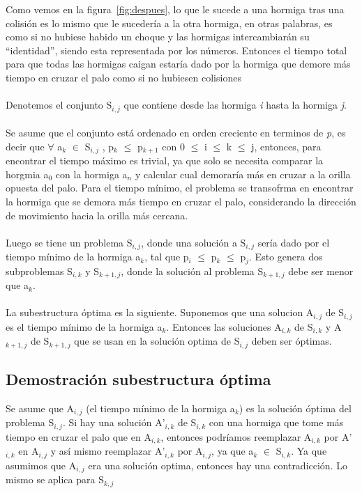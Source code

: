 \documentclass[11pt,spanish]{article}
\begin{document}
Como vemos en la figura~\ref{fig:despues}, lo que le sucede a una hormiga tras una colisión es lo mismo que le sucedería a la otra hormiga, en otras palabras, es como si no hubiese habido un choque y las hormigas intercambiarán su ``identidad'', siendo esta representada por los números. Entonces el tiempo total para que todas las hormigas caigan estaría dado por la hormiga que demore más tiempo en cruzar el palo como si no hubiesen colisiones\\\\Denotemos el conjunto S$_{i,j}$ que contiene desde las hormiga \emph{i} hasta la hormiga \emph{j}.\\\\Se asume que el conjunto está ordenado en orden creciente en terminos de \emph{p}, es decir que $\forall$ a$_{k}$ $\in$ S$_{i,j}$ , p$_{k}$ $\leq$ p$_{k+1}$ con 0 $\leq$ i $\leq$ k $\leq$ j, entonces, para encontrar el tiempo máximo es trivial, ya que solo se necesita comparar la horgmia a$_{0}$ con la hormiga a$_{n}$ y calcular cual demoraría más en cruzar a la orilla opuesta del palo. Para el tiempo mínimo, el problema se transofrma en encontrar la hormiga que se demora más tiempo en cruzar el palo, considerando la dirección de movimiento hacia la orilla más cercana.\\\\Luego se tiene un problema S$_{i,j}$, donde una solución a S$_{i,j}$ sería dado por el tiempo mínimo de la hormiga a$_{k}$, tal que p$_{i}$ $\leq$ p$_{k}$ $\leq$ p$_{j}$. Esto genera dos subproblemas S$_{i,k}$ y S$_{k+1,j}$, donde la solución al problema S$_{k+1,j}$ debe ser menor que a$_{k}$.\\\\La subestructura óptima es la siguiente. Suponemos que una solucion A$_{i,j}$ de S$_{i,j}$ es el tiempo mínimo de la hormiga a$_{k}$. Entonces las soluciones A$_{i,k}$ de S$_{i,k}$ y A$_{k+1,j}$ de S$_{k+1,j}$ que se usan en la solución optima de S$_{i,j}$ deben ser óptimas.
\subsection{Demostración subestructura óptima}
Se asume que A$_{i,j}$ (el tiempo mínimo de la hormiga a$_{k}$) es la solución óptima del problema S$_{i,j}$. Si hay una solución A'$_{i,k}$ de S$_{i,k}$ con una hormiga que tome más tiempo en cruzar el palo que en A$_{i,k}$, entonces podríamos reemplazar A$_{i,k}$ por A'$_{i,k}$ en A$_{i,j}$ y así mismo reemplazar A'$_{i,k}$ por A$_{i,j}$, ya que a$_{k}$ $\in$ S$_{i,k}$. Ya que asumimos que A$_{i,j}$ era una solución optima, entonces hay una contradicción. Lo mismo se aplica para S$_{k,j}$
\end{document}
